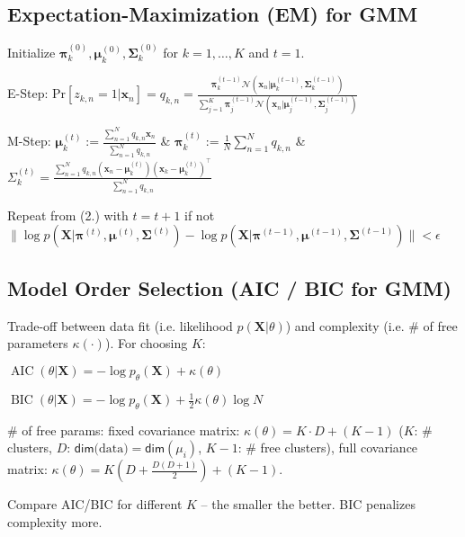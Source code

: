 \documentclass[a4paper, 11pt, landscape]{article}
\begin{document}
\begin{multicols*}{3}
\subsection{Expectation-Maximization (EM) for GMM}
\begin{compactenum}
	\item Initialize $\boldsymbol{\pi}_k^{(0)}, \boldsymbol{\mu}_k^{(0)}, \boldsymbol{\Sigma}_k^{(0)}$ for $k = 1, \ldots, K$ and $t=1$.
	\item E-Step: Pr$[z_{k,n} = 1 | \mathbf{x}_n] = q_{k, n} = \frac{\boldsymbol{\pi}_k^{(t-1)} \mathcal{N}(\mathbf{x}_n | \boldsymbol{\mu}_k^{(t-1)}, \boldsymbol{\Sigma}_k^{(t-1)})}{\sum_{j=1}^K \boldsymbol{\pi}_j^{(t-1)} \mathcal{N}(\mathbf{x}_n | \boldsymbol{\mu}_j^{(t-1)}, \boldsymbol{\Sigma}_j^{(t-1)})}$
	\item M-Step: $\boldsymbol{\mu}_k^{(t)} := \frac{\sum_{n=1}^N q_{k,n} \mathbf{x}_n}{\sum_{n=1}^N q_{k,n}}$\hspace{20pt} \& \hspace{20pt} $\boldsymbol{\pi}_k^{(t)} := \frac{1}{N} \sum_{n=1}^N q_{k,n}$ \hspace{20pt} \& \hspace{20pt} $\Sigma_k^{(t)} = \frac{\sum_{n=1}^N q_{k, n} (\mathbf{x}_n - \boldsymbol{\mu}_k^{(t)})(\mathbf{x}_k - \boldsymbol{\mu}_k^{(t)})^\top}{\sum_{n=1}^N q_{k,n}}$
	\item Repeat from (2.) with $t = t + 1$ if not $\| \log p(\mathbf{X} | \boldsymbol{\pi}^{(t)}, \boldsymbol{\mu}^{(t)}, \boldsymbol{\Sigma}^{(t)}) - \log p(\mathbf{X} | \boldsymbol{\pi}^{(t-1)}, \boldsymbol{\mu}^{(t-1)}, \boldsymbol{\Sigma}^{(t-1)}) \| < \epsilon$
\end{compactenum}

\subsection{Model Order Selection (AIC / BIC for GMM)}
Trade-off between data fit (i.e. likelihood $p(\mathbf{X} | \theta)$) and complexity (i.e. \# of free parameters $\kappa(\cdot)$). For choosing $K$:
\begin{inparaitem}[\color{red}\textbullet]
	\item $\operatorname{AIC}(\theta | \mathbf{X}) = -\log p_\theta(\mathbf{X}) + \kappa(\theta)$
	\item $\operatorname{BIC}(\theta | \mathbf{X}) = -\log p_\theta(\mathbf{X}) + \frac{1}{2} \kappa(\theta) \log N$
	\item \# of free params: fixed covariance matrix: $\kappa(\theta) = K \cdot D + (K - 1)$ ($K$: \# clusters, $D$: $\mathsf{dim}\text{(data)}=\mathsf{dim}(\mu_i)$, $K-1$: \# free clusters), full covariance matrix: $\kappa(\theta) = K(D + \frac{D(D+1)}{2}) + (K - 1)$.
	\item Compare AIC/BIC for different $K$ -- the smaller the better. BIC penalizes complexity more.
\end{inparaitem}


\end{multicols*}
\end{document}
